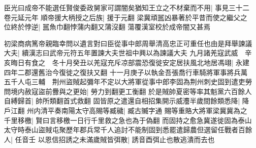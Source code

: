 臣光曰成帝不能選任賢俊委政舅家可謂闇矣猶知王立之不材棄而不用|{
	事見三十二卷元延元年}
順帝援大柄授之后族|{
	援于元翻}
梁冀頑嚚凶暴著於平昔而使之繼父之位終於悖逆|{
	嚚魚巾翻悖蒲内翻又蒲沒翻}
蕩覆漢室校於成帝闇又甚焉

初梁商病篤帝親臨幸問以遺言對曰臣從事中郎周舉清高忠正可重任也由是拜舉諫議大夫|{
	續漢志曰武帝元符五年置諫大夫世祖中興以為諫議大夫}
九月諸羌寇武威　辛亥晦日有食之　冬十月癸丑以羌寇充斥凉部震恐復徙安定居扶風北地居馮翊|{
	永建四年二郡還舊治今復徙之復扶又翻}
十一月庚子以執金吾張喬行車騎將軍事將兵萬五千人屯三輔　荆州盜賊起彌年不定以大將軍從事中郎李固為荆州刺史固到遣吏勞問境内赦寇盜前釁與之更始|{
	勞力到翻更工衡翻}
於是賊帥夏密等率其魁黨六百餘人自縛歸首|{
	帥所類翻首式救翻}
固皆原之遣還自相招集開示威灋半歲間餘類悉降|{
	降戶江翻}
州内清平奏南陽太守高賜等臧穢|{
	臧古贓字通}
賜等重賂大將軍梁冀冀為之千里移檄|{
	賢曰言移檄一日行千里救之急也為于偽翻}
而固持之愈急冀遂徙固為泰山太守時泰山盜賊屯聚歷年郡兵常千人追討不能制固到悉罷遣歸農但選留任戰者百餘人|{
	任音壬}
以恩信招誘之未滿歲賊皆弭散|{
	誘音酉弭止也散逃潰而去也}


